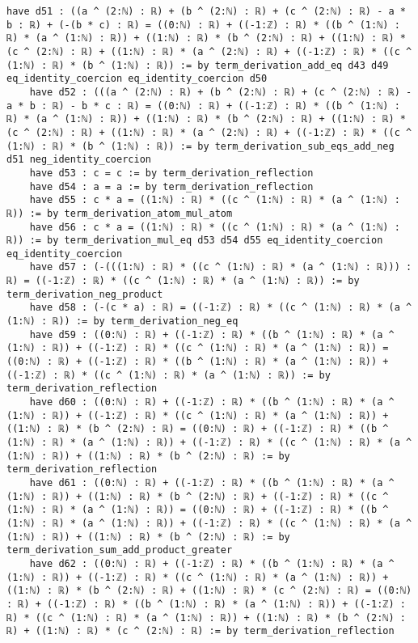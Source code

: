 \documentclass{article}
\begin{document}
\begin{tcolorbox}[colback=white!10, width=\linewidth]
\begin{lstlisting}[language=Lean4]
    have d51 : ((a ^ (2:ℕ) : ℝ) + (b ^ (2:ℕ) : ℝ) + (c ^ (2:ℕ) : ℝ) - a * b : ℝ) + (-(b * c) : ℝ) = ((0:ℕ) : ℝ) + ((-1:ℤ) : ℝ) * ((b ^ (1:ℕ) : ℝ) * (a ^ (1:ℕ) : ℝ)) + ((1:ℕ) : ℝ) * (b ^ (2:ℕ) : ℝ) + ((1:ℕ) : ℝ) * (c ^ (2:ℕ) : ℝ) + ((1:ℕ) : ℝ) * (a ^ (2:ℕ) : ℝ) + ((-1:ℤ) : ℝ) * ((c ^ (1:ℕ) : ℝ) * (b ^ (1:ℕ) : ℝ)) := by term_derivation_add_eq d43 d49 eq_identity_coercion eq_identity_coercion d50
    have d52 : (((a ^ (2:ℕ) : ℝ) + (b ^ (2:ℕ) : ℝ) + (c ^ (2:ℕ) : ℝ) - a * b : ℝ) - b * c : ℝ) = ((0:ℕ) : ℝ) + ((-1:ℤ) : ℝ) * ((b ^ (1:ℕ) : ℝ) * (a ^ (1:ℕ) : ℝ)) + ((1:ℕ) : ℝ) * (b ^ (2:ℕ) : ℝ) + ((1:ℕ) : ℝ) * (c ^ (2:ℕ) : ℝ) + ((1:ℕ) : ℝ) * (a ^ (2:ℕ) : ℝ) + ((-1:ℤ) : ℝ) * ((c ^ (1:ℕ) : ℝ) * (b ^ (1:ℕ) : ℝ)) := by term_derivation_sub_eqs_add_neg d51 neg_identity_coercion
    have d53 : c = c := by term_derivation_reflection
    have d54 : a = a := by term_derivation_reflection
    have d55 : c * a = ((1:ℕ) : ℝ) * ((c ^ (1:ℕ) : ℝ) * (a ^ (1:ℕ) : ℝ)) := by term_derivation_atom_mul_atom
    have d56 : c * a = ((1:ℕ) : ℝ) * ((c ^ (1:ℕ) : ℝ) * (a ^ (1:ℕ) : ℝ)) := by term_derivation_mul_eq d53 d54 d55 eq_identity_coercion eq_identity_coercion
    have d57 : (-(((1:ℕ) : ℝ) * ((c ^ (1:ℕ) : ℝ) * (a ^ (1:ℕ) : ℝ))) : ℝ) = ((-1:ℤ) : ℝ) * ((c ^ (1:ℕ) : ℝ) * (a ^ (1:ℕ) : ℝ)) := by term_derivation_neg_product
    have d58 : (-(c * a) : ℝ) = ((-1:ℤ) : ℝ) * ((c ^ (1:ℕ) : ℝ) * (a ^ (1:ℕ) : ℝ)) := by term_derivation_neg_eq
    have d59 : ((0:ℕ) : ℝ) + ((-1:ℤ) : ℝ) * ((b ^ (1:ℕ) : ℝ) * (a ^ (1:ℕ) : ℝ)) + ((-1:ℤ) : ℝ) * ((c ^ (1:ℕ) : ℝ) * (a ^ (1:ℕ) : ℝ)) = ((0:ℕ) : ℝ) + ((-1:ℤ) : ℝ) * ((b ^ (1:ℕ) : ℝ) * (a ^ (1:ℕ) : ℝ)) + ((-1:ℤ) : ℝ) * ((c ^ (1:ℕ) : ℝ) * (a ^ (1:ℕ) : ℝ)) := by term_derivation_reflection
    have d60 : ((0:ℕ) : ℝ) + ((-1:ℤ) : ℝ) * ((b ^ (1:ℕ) : ℝ) * (a ^ (1:ℕ) : ℝ)) + ((-1:ℤ) : ℝ) * ((c ^ (1:ℕ) : ℝ) * (a ^ (1:ℕ) : ℝ)) + ((1:ℕ) : ℝ) * (b ^ (2:ℕ) : ℝ) = ((0:ℕ) : ℝ) + ((-1:ℤ) : ℝ) * ((b ^ (1:ℕ) : ℝ) * (a ^ (1:ℕ) : ℝ)) + ((-1:ℤ) : ℝ) * ((c ^ (1:ℕ) : ℝ) * (a ^ (1:ℕ) : ℝ)) + ((1:ℕ) : ℝ) * (b ^ (2:ℕ) : ℝ) := by term_derivation_reflection
    have d61 : ((0:ℕ) : ℝ) + ((-1:ℤ) : ℝ) * ((b ^ (1:ℕ) : ℝ) * (a ^ (1:ℕ) : ℝ)) + ((1:ℕ) : ℝ) * (b ^ (2:ℕ) : ℝ) + ((-1:ℤ) : ℝ) * ((c ^ (1:ℕ) : ℝ) * (a ^ (1:ℕ) : ℝ)) = ((0:ℕ) : ℝ) + ((-1:ℤ) : ℝ) * ((b ^ (1:ℕ) : ℝ) * (a ^ (1:ℕ) : ℝ)) + ((-1:ℤ) : ℝ) * ((c ^ (1:ℕ) : ℝ) * (a ^ (1:ℕ) : ℝ)) + ((1:ℕ) : ℝ) * (b ^ (2:ℕ) : ℝ) := by term_derivation_sum_add_product_greater
    have d62 : ((0:ℕ) : ℝ) + ((-1:ℤ) : ℝ) * ((b ^ (1:ℕ) : ℝ) * (a ^ (1:ℕ) : ℝ)) + ((-1:ℤ) : ℝ) * ((c ^ (1:ℕ) : ℝ) * (a ^ (1:ℕ) : ℝ)) + ((1:ℕ) : ℝ) * (b ^ (2:ℕ) : ℝ) + ((1:ℕ) : ℝ) * (c ^ (2:ℕ) : ℝ) = ((0:ℕ) : ℝ) + ((-1:ℤ) : ℝ) * ((b ^ (1:ℕ) : ℝ) * (a ^ (1:ℕ) : ℝ)) + ((-1:ℤ) : ℝ) * ((c ^ (1:ℕ) : ℝ) * (a ^ (1:ℕ) : ℝ)) + ((1:ℕ) : ℝ) * (b ^ (2:ℕ) : ℝ) + ((1:ℕ) : ℝ) * (c ^ (2:ℕ) : ℝ) := by term_derivation_reflection

\end{lstlisting}
\end{tcolorbox}
\end{document}
